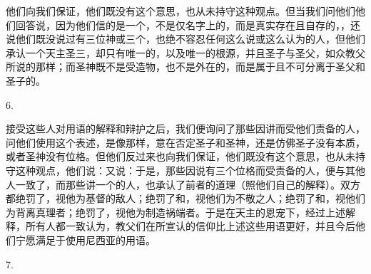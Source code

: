 他们向我们保证，他们既没有这个意思，也从未持守这种观点。但当我们问他们他们回答说，因为他们信的是一个，不是仅名字上的，而是真实存在且自存的，，还说他们既没说过有三位神或三个，也绝不容忍任何这么说或这么认为的人，但他们承认一个天主圣三，却只有唯一的，以及唯一的根源，并且圣子与圣父，如众教父所说的那样；而圣神既不是受造物，也不是外在的，而是属于且不可分离于圣父和圣子的。\par

6. \par

接受这些人对用语的解释和辩护之后，我们便询问了那些因讲而受他们责备的人，问他们使用这个表述，是像那样，意在否定圣子和圣神，还是仿佛圣子没有本质，或者圣神没有位格。但他们反过来也向我们保证，他们既没有这个意思，也从未持守这种观点，他们说：又说：于是，那些因说有三个位格而受责备的人，便与其他人一致了，而那些讲一个的人，也承认了前者的道理（照他们自己的解释）。双方都绝罚了，视他为基督的敌人；绝罚了和，视他们为不敬之人；绝罚了和，视他们为背离真理者；绝罚了，视他为制造祸端者。于是在天主的恩宠下，经过上述解释，所有人都一致认为，教父们在所宣认的信仰比上述这些用语更好，并且今后他们宁愿满足于使用尼西亚的用语。\par

7. \par

